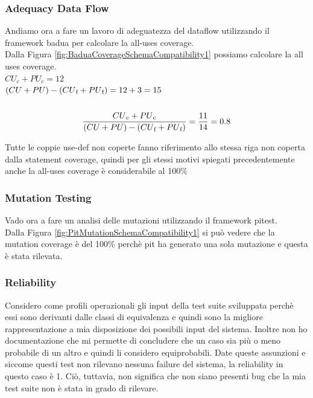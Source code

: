 \documentclass[10pt, a4paper]{article}
\begin{document}
\subsubsection{Adequacy Data Flow}
Andiamo ora a fare un lavoro di adeguatezza del dataflow utilizzando il framework badua per calcolare la all-uses coverage. \\
Dalla Figura \ref{fig:BaduaCoverageSchemaCompatibility1} possiamo calcolare la all uses coverage. \\
\(CU_c + PU_c = 12\) \\
\( (CU + PU) - (CU\textsubscript{f} + PU\textsubscript{f}) = 12 + 3 = 15\) \\ \\
\[\frac{{CU\textsubscript{c} + PU\textsubscript{c}}}{{(CU + PU) - (CU\textsubscript{f} + PU\textsubscript{f})}} = \frac{{11}}{{14}} = 0.8\]

Tutte le coppie use-def non coperte fanno riferimento allo stessa riga non coperta dalla statement coverage, quindi
per gli stessi motivi spiegati precedentemente anche la all-uses coverage è considerabile al 100\%
\subsubsection{Mutation Testing}
Vado ora a fare un analisi delle mutazioni utilizzando il framework pitest. \\
Dalla Figura \ref{fig:PitMutationSchemaCompatibility1} si può vedere che la mutation coverage è del 100\% perchè
pit ha generato una sola mutazione e questa è stata rilevata. \\


\subsubsection{Reliability}
Considero come profili operazionali gli input della test suite sviluppata perchè essi sono derivanti dalle classi di equivalenza
e quindi sono la migliore rappresentazione a mia disposizione dei possibili input del sistema. Inoltre non ho documentazione che
mi permette di concludere che un caso sia più o meno probabile di un altro e quindi li considero equiprobabili. Date queste 
assunzioni e siccome questi test non rilevano nessuna failure del sistema, la reliability in questo caso è 1. Ciò, tuttavia,
 non significa che non siano presenti bug che la mia test suite non è stata in grado di rilevare.
\end{document}
